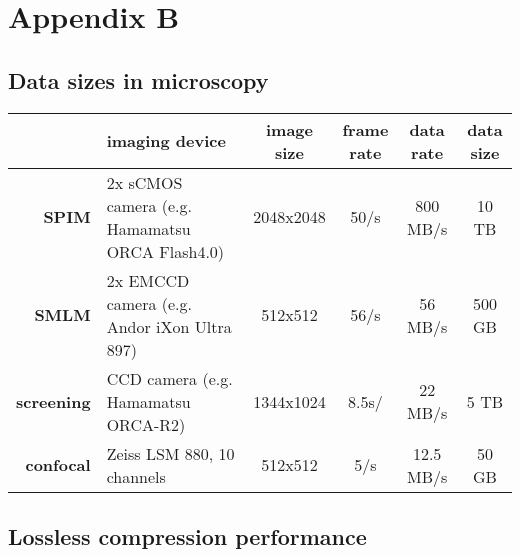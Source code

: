 \chapter{Appendix B}
\label{app:tables}
\setcounter{table}{0}
\renewcommand{\thetable}{B\arabic{table}}

\section*{Data sizes in microscopy}

\begin{table}[tbp]
  \begin{small}
    \renewcommand{\arraystretch}{2}
    \centering
    \begin{tabular}{rp{5cm}cccc}
        & \textbf{imaging device} & \textbf{image size} &  \parbox[c]{1.2cm}{\textbf{frame}\\ \textbf{rate}} & \textbf{data rate} & \parbox[c]{1.2cm}{\textbf{data\\ size}} \\
        \hline
        \hline
        \textbf{SPIM} & 2x sCMOS camera (e.g. Hamamatsu ORCA Flash4.0) & 2048x2048 & 50/s & 800 MB/s & 10 TB \\ \hline
        \textbf{SMLM} & 2x EMCCD camera (e.g. Andor iXon Ultra 897) & 512x512 & 56/s & 56 MB/s & 500 GB \\ \hline
        \textbf{screening} & CCD camera (e.g. Hamamatsu ORCA-R2) & 1344x1024 & 8.5s/ & 22 MB/s & 5 TB \\ \hline
        \textbf{confocal} & Zeiss LSM 880, 10 channels & 512x512 & 5/s & 12.5 MB/s & 50 GB \\ 
    \end{tabular}
    \label{tab:sizes}
  \end{small}
\end{table}


  
\section*{Lossless compression performance}

